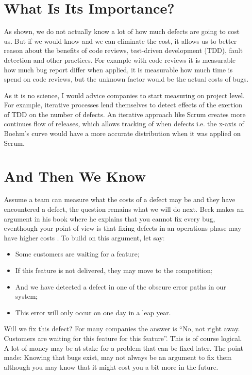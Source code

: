 \section*{What Is Its Importance?}

As shown, we do not actually know a lot of how much defects are going to cost us.
But if we would know and we can eliminate the cost, it allows us to better reason about the benefits of code reviews, test-driven development (TDD), fault detection and other practices.
For example with code reviews it is measurable how much bug report differ when applied, it is measurable how much time is spend on code reviews, but the unknown factor would be the actual costs of bugs.

As it is no science, I would advice companies to start measuring on project level. For example, iterative processes lend themselves to detect effects of the exertion of TDD on the number of defects.
An iterative approach like Scrum creates more continues flow of releases, which allows tracking of when defects i.e. the x-axis of Boehm's curve would have a more accurate distribution when it was applied on Scrum.

\section*{And Then We Know}

Assume a team can measure what the costs of a defect may be and they have encountered a defect, the question remains what we will do next.
Beck makes an argument in his book where he explains that you cannot fix every bug, eventhough your point of view is that fixing defects in an operations phase may have higher costs \autocite[22]{beck2000extreme}.
To build on this argument, let say:
\begin{itemize}[noitemsep]
\item Some customers are waiting for a feature;
\item If this feature is not delivered, they may move to the competition;
\item And we have detected a defect in one of the obscure error paths in our system;
\item This error will only occur on one day in a leap year.
\end{itemize}
Will we fix this defect? For many companies the answer is ``No, not right away. Customers are waiting for this feature for this feature''.
This is of course logical. A lot of money may be at stake for a problem that can be fixed later.
The point made: Knowing that bugs exist, may not always be an argument to fix them although you may know that it might cost you a bit more in the future.

